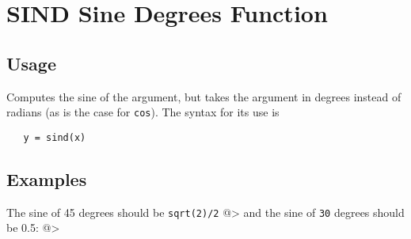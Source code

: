 \section{SIND Sine Degrees Function}

\subsection{Usage}

Computes the sine of the argument, but takes
the argument in degrees instead of radians (as is the case
for \verb|cos|). The syntax for its use is
\begin{verbatim}
   y = sind(x)
\end{verbatim}
\subsection{Examples}

The sine of 45 degrees should be \verb|sqrt(2)/2|
@>
and the sine of \verb|30| degrees should be 0.5:
@>
